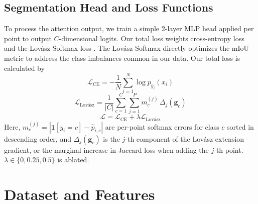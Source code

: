 \documentclass[10pt,twocolumn,letterpaper]{article}
\begin{document}
\subsection{Segmentation Head and Loss Functions}
To process the attention output, we train a simple 2-layer MLP head applied per point to output $C$-dimensional logits. Our total loss weights cross-entropy loss and the Lov\'{a}sz-Softmax loss \cite{berman2018lovaszsoftmaxlosstractablesurrogate}. The Lov\'{a}sz-Softmax directly optimizes the mIoU metric to address the class imbalances common in our data. Our total loss is calculated by
\[
    \mathcal{L}_{\text{CE}} = -\frac{1}{N} \sum_{i=1}^N \log p_{\hat{y}_i}(x_i)
\]
\[
    \mathcal{L}_{\text{Lov\'{a}sz}} =   \frac{1}{|C|} \sum_{c=1}^{C} \sum_{j=1}^{P} m_c^{(j)} \, \Delta_j(\mathbf{g}_c)
\]
\[
    \mathcal{L} = \mathcal{L}_{\text{CE}} + \lambda \mathcal{L}_{\text{Lov\'{a}sz}}
\]
Here, $m_c^{(j)} = |\mathbf{1}[y_i = c] - \hat{p}_{i,c}|$ are per-point softmax errors for class $c$ sorted in descending order, and $\Delta_j(\mathbf{g}_c)$ is the $j$-th component of the Lov\'{a}sz extension gradient, or the marginal increase in Jaccard loss when adding the $j$-th point. $\lambda \in \{
0, 0.25, 0.5\}$ is ablated.%

\section{Dataset and Features}
\end{document}
